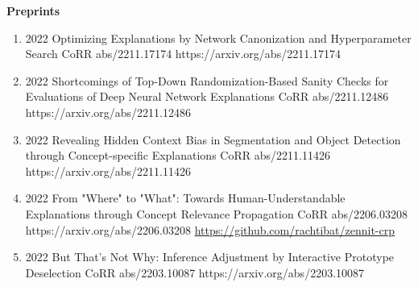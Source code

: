 \documentclass[10pt,a4paper]{article} %
\begin{document}
\headedsection %
{\bf Preprints}{}
{
    \begin{enumerate}

        \item {}
                        {2022}
                        {Optimizing Explanations by Network Canonization and Hyperparameter Search}
                        {CoRR abs/2211.17174}
                        {https://arxiv.org/abs/2211.17174}

        \item {}
                        {2022}
                        {Shortcomings of Top-Down Randomization-Based Sanity Checks for Evaluations of Deep Neural Network Explanations}
                        {CoRR abs/2211.12486}
                        {https://arxiv.org/abs/2211.12486}

        \item {}
                        {2022}
                        {Revealing Hidden Context Bias in Segmentation and Object Detection through Concept-specific Explanations}
                        {CoRR abs/2211.11426}
                        {https://arxiv.org/abs/2211.11426}

        \item {}
                        {2022}
                        {From "Where" to "What": Towards Human-Understandable Explanations through Concept Relevance Propagation}
                        {CoRR abs/2206.03208}
                        {https://arxiv.org/abs/2206.03208}
                        {\href{https://github.com/rachtibat/zennit-crp}{https://github.com/rachtibat/zennit-crp}}

        \item {}
                            {2022}
                            {But That's Not Why: Inference Adjustment by Interactive Prototype Deselection}
                            {CoRR abs/2203.10087}
                            {https://arxiv.org/abs/2203.10087}


\end{enumerate}}
\end{document}
